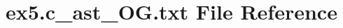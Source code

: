 \hypertarget{ex5_8c__ast__OG_8txt}{}\section{ex5.\+c\+\_\+ast\+\_\+\+O\+G.\+txt File Reference}
\label{ex5_8c__ast__OG_8txt}
